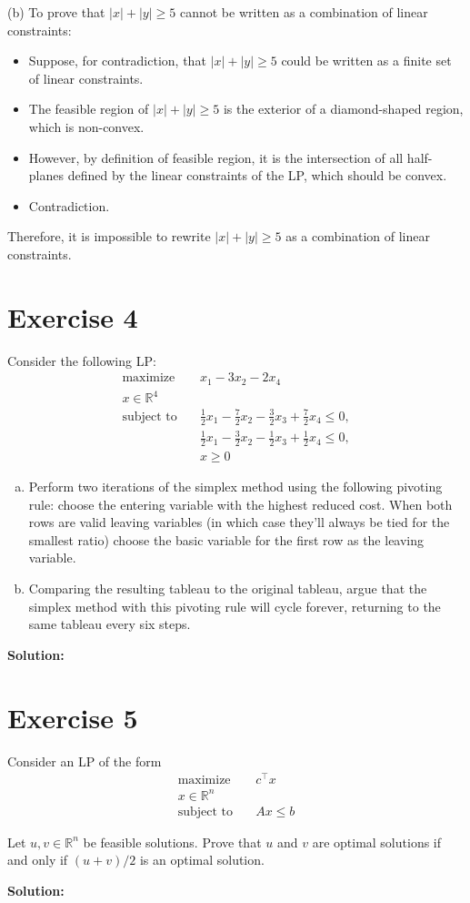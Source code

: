 \documentclass{article}
\begin{document}
(b) To prove that $|x| + |y| \geq 5$ cannot be written as a combination of linear constraints:

\begin{itemize}
\item Suppose, for contradiction, that $|x| + |y| \geq 5$ could be written as a finite set of linear constraints.
\item The feasible region of $|x| + |y| \geq 5$ is the exterior of a diamond-shaped region, which is non-convex.
\item However, by definition of feasible region, it is the intersection of all half-planes defined by the linear constraints of the LP, which should be convex.
\item Contradiction.
\end{itemize}
Therefore, it is impossible to rewrite $|x| + |y| \geq 5$ as a combination of linear constraints.

\newpage

\section*{Exercise 4}
Consider the following LP:
\begin{align*}
\text{maximize} \quad & x_1 - 3x_2 - 2x_4 \\
x \in \mathbb{R}^4 \\
\text{subject to} \quad & \frac{1}{2}x_1 - \frac{7}{2}x_2 - \frac{3}{2}x_3 + \frac{7}{2}x_4 \leq 0, \\
& \frac{1}{2}x_1 - \frac{3}{2}x_2 - \frac{1}{2}x_3 + \frac{1}{2}x_4 \leq 0, \\
& x \geq 0
\end{align*}

\begin{enumerate}[(a)]
\item Perform two iterations of the simplex method using the following pivoting rule: choose the entering variable with the highest reduced cost. When both rows are valid leaving variables (in which case they'll always be tied for the smallest ratio) choose the basic variable for the first row as the leaving variable.
\item Comparing the resulting tableau to the original tableau, argue that the simplex method with this pivoting rule will cycle forever, returning to the same tableau every six steps.
\end{enumerate}

\textbf{Solution: }
\newpage

\section*{Exercise 5}
Consider an LP of the form
\begin{align*}
\text{maximize} \quad & c^\top x \\
x \in \mathbb{R}^n \\
\text{subject to} \quad & Ax \leq b
\end{align*}

Let $u, v \in \mathbb{R}^n$ be feasible solutions. Prove that $u$ and $v$ are optimal solutions if and only if $(u + v)/2$ is an optimal solution.

\textbf{Solution: }
\end{document}
